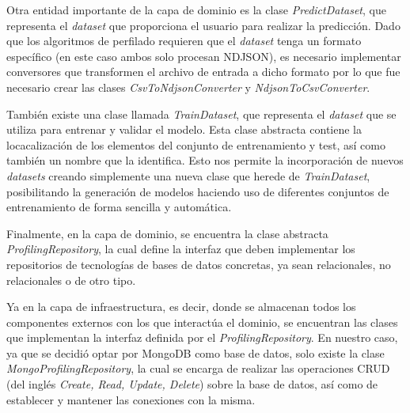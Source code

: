 \bigskip
Otra entidad importante de la capa de dominio es la clase \textit{PredictDataset}, que representa el \textit{dataset} que proporciona el usuario
para realizar la predicción. Dado que los algoritmos de perfilado requieren que el \textit{dataset} tenga un formato específico (en este caso
ambos solo procesan NDJSON), es necesario implementar conversores que transformen el archivo de entrada a dicho formato por lo que
fue necesario crear las clases \textit{CsvToNdjsonConverter} y \textit{NdjsonToCsvConverter}.

\bigskip
También existe una clase llamada \textit{TrainDataset}, que representa
el \textit{dataset} que se utiliza para entrenar y validar el modelo. Esta clase abstracta contiene la locacalización de los elementos
del conjunto de entrenamiento y test, así como también un nombre que la identifica. Esto nos permite la incorporación de nuevos \textit{datasets} creando simplemente
una nueva clase que herede de \textit{TrainDataset}, posibilitando la generación de modelos haciendo uso de diferentes conjuntos de entrenamiento de forma sencilla y automática. 

\bigskip
Finalmente, en la capa de dominio, se encuentra la clase abstracta \textit{ProfilingRepository}, la cual define la interfaz que deben implementar
los repositorios de tecnologías de bases de datos concretas, ya sean relacionales, no relacionales o de otro tipo.

\bigskip
Ya en la capa de infraestructura, es decir, donde se almacenan todos los componentes externos con los que interactúa el dominio, se encuentran las clases que implementan
la interfaz definida por el \textit{ProfilingRepository}. En nuestro caso, ya que se decidió optar por MongoDB como base de datos, solo existe
la clase \textit{MongoProfilingRepository}, la cual se encarga de realizar las operaciones CRUD (del inglés \textit{Create, Read, Update, Delete}) sobre la base de datos, así
como de establecer y mantener las conexiones con la misma.

